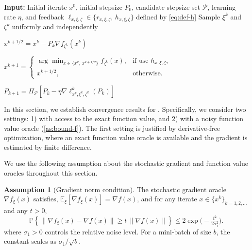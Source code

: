 \documentclass{article}
\theoremstyle{definition}
\newtheorem{assumption}{Assumption}[section]
\DeclareRobustCommand{\namerefc}[2]{\hyperref[#2]{\textcolor{#1}{\nameref*{#2}}}}
\newcommand{\osgd}{\namerefc{purple}{alg:sosgm}}
\begin{document}
\begin{algorithm}[ht!]
\caption{{\texttt{OSGM-SGD}}}
\label{alg:sosgm}
\begin{algorithmic}[1]
    \STATE \textbf{Input:} Initial iterate $x^0$, initial stepsize $P_0$, candidate stepsize set $\mathcal{P}$, learning rate $\eta$, 
    and feedback $\ell_{x,\xi,\zeta} \in \{ r_{x,\xi,\zeta},\, h_{x,\xi,\zeta} \}$ defined by \eqref{eq:def-h}
        \STATE Sample $\xi^k$ and $\zeta^k$ uniformly and independently

        \STATE 
        $x^{k+1/2}=x^k - P_k \nabla f_{\xi^k}(x^k)$

        \STATE
        $x^{k+1} =
        \begin{cases}
        \arg\min_{x \in \{ x^k,\, x^{k+1/2} \}} f_{\zeta^k}(x), & \text{if use } h_{x,\xi,\zeta}, \\
        x^{k+1/2}, & \text{otherwise.}
        \end{cases}$

        \STATE 
        $P_{k+1}= \Pi_{\mathcal{P}} [P_k - \eta \nabla \ell_{x^k,\xi^k,\zeta^k}^k(P_k)]$
    \ENDFOR
\end{algorithmic}
\end{algorithm}


In this section, we establish convergence results for {\osgd}. Specifically, we consider two settings: 1) with access to the exact function value, and 2) with a noisy function value oracle (\cref{as:bound-f}). The first setting is justified by derivative-free optimization, where an exact function value oracle is available and the gradient is estimated by finite difference. 

We use the following assumption about the stochastic gradient and function value oracles throughout this section.

\begin{assumption}[Gradient norm condition]
  \label{as:bound-g}
  The stochastic gradient oracle $\nabla f_{\xi} (x)$ satisfies, $\mathbb{E}_{\xi} [\nabla f_{\xi} (x)]={\nabla}f (x)$, and for any iterate $x \in \{ x^k \}_{k = 1, 2, \ldots}$ and any $t > 0$,
    \begin{equation}\label{eq:hp-gradient-condition} 
    \mathbb{P}\!\left\{\,\|\nabla f_{\xi}(x) - \nabla f(x)\| \ge t \,\|\nabla f(x)\| \right\}
    \le
    2 \exp\!\big(-\tfrac{t^{2}}{2\sigma_1^{2}} \big).
    \end{equation}
    where $\sigma_1 > 0$ controls the relative noise level.  
    For a mini-batch of size $b$, the constant scales as $\sigma_1 / \sqrt{b}$.
\end{assumption}
\end{document}
